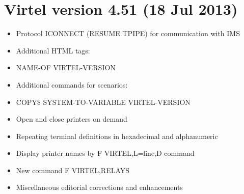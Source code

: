 \documentclass[letterpaper,10pt,english]{sphinxmanual}
\begin{document}
\section{Virtel version 4.51 (18 Jul 2013)}
\label{\detokenize{Installation_Guide:virtel-version-4-51-18-jul-2013}}
\begin{itemize}
\item {} 
Protocol ICONNECT (RESUME TPIPE) for communication with IMS

\end{itemize}

\begin{itemize}
\item {} 
Additional HTML tags:

\item {} 
NAME-OF VIRTEL-VERSION

\end{itemize}

\begin{itemize}
\item {} 
Additional commands for scenarios:

\item {} 
COPY\$ SYSTEM-TO-VARIABLE VIRTEL-VERSION

\end{itemize}

\begin{itemize}
\item {} 
Open and close printers on demand

\item {} 
Repeating terminal definitions in hexadecimal and alphanumeric

\item {} 
Display printer names by F VIRTEL,L=line,D command

\item {} 
New command F VIRTEL,RELAYS

\item {} 
Miscellaneous editorial corrections and enhancements

\end{itemize}
\end{document}
